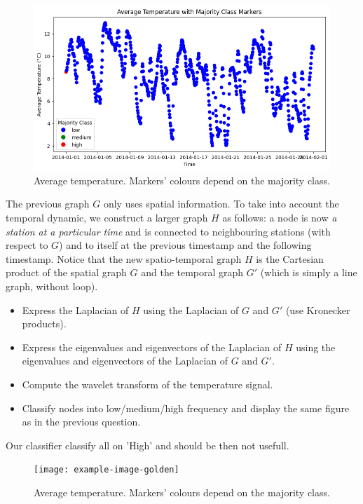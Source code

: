 \documentclass[11pt]{article}
\begin{document}
\begin{solution}
\begin{figure}
    \centering
    \begin{minipage}[t]{1\textwidth}
    \centerline{\includegraphics[width=\textwidth]{output3.png}}
    \end{minipage}
    \caption{Average temperature. Markers' colours depend on the majority class.}
\end{figure}
\end{solution}

\newpage
\begin{exercise}
The previous graph $G$ only uses spatial information.
To take into account the temporal dynamic, we construct a larger graph $H$ as follows: a node is now \textit{a station at a particular time} and is connected to neighbouring stations (with respect to $G$) and to itself at the previous timestamp and the following timestamp.
Notice that the new spatio-temporal graph $H$ is the Cartesian product of the spatial graph $G$ and the temporal graph $G'$ (which is simply a line graph, without loop).

\begin{itemize}
    \item Express the Laplacian of $H$ using the Laplacian of $G$ and $G'$ (use Kronecker products).
    \item Express the eigenvalues and eigenvectors of the Laplacian of $H$ using the eigenvalues and eigenvectors of the Laplacian of $G$ and $G'$.
    \item Compute the wavelet transform of the temperature signal.
    \item Classify nodes into low/medium/high frequency and display the same figure as in the previous question.
\end{itemize}
\end{exercise}

\begin{solution}
Our classifier classify all on 'High' and should be then not usefull.
\begin{figure}
    \centering
    \begin{minipage}[t]{0.8\textwidth}
    \centerline{\texttt{[image: example-image-golden]}}
    \end{minipage}
    \caption{Average temperature. Markers' colours depend on the majority class.}
\end{figure}
\end{solution}
\end{document}
